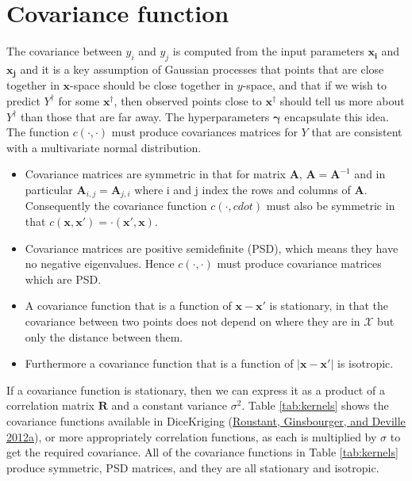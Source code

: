 \documentclass[
  12pt,
  a4paper,
  twoside]{book}
\providecommand{\tightlist}{%
  \setlength{\itemsep}{0pt}\setlength{\parskip}{0pt}}
\begin{document}
\hypertarget{covariance}{%
\section{Covariance function}\label{covariance}}

The covariance between \(y_i\) and \(y_j\) is computed from the input parameters \(\mathbf{x_i}\) and \(\mathbf{x_j}\) and it is a key assumption of Gaussian processes that points that are close together in \(\mathbf{x}\)-space should be close together in \(y\)-space, and that if we wish to predict \(Y^\dagger\) for some \(\mathbf{x^\dagger}\), then observed points close to \(\mathbf{x^\dagger}\) should tell us more about \(Y^\dagger\) than those that are far away. The hyperparameters \(\mathbf{\gamma}\) encapsulate this idea. The function \(c(\cdot, \cdot)\) must
produce covariances matrices for \(Y\) that are consistent with a multivariate normal distribution.

\begin{itemize}
\tightlist
\item
  Covariance matrices are symmetric in that for matrix \(\mathbf{A}\), \(\mathbf{A}=\mathbf{A}^{-1}\) and in particular \(\mathbf{A}_{i,j} = \mathbf{A}_{j,i}\) where i and j index the rows and columns of \(\mathbf{A}\). Consequently the covariance function \(c(\cdot, cdot)\) must also be symmetric in that \(c(\mathbf{x}, \mathbf{x'}) = \cdot(\mathbf{x'}, \mathbf{x})\).
\item
  Covariance matrices are positive semidefinite (PSD), which means they have no negative eigenvalues. Hence \(c(\cdot,\cdot)\) must produce covariance matrices which are PSD.
\item
  A covariance function that is a function of \(\mathbf{x} - \mathbf{x'}\) is stationary, in that the covariance between two points does not depend on where they are in \(\mathcal{X}\) but only the distance between them.
\item
  Furthermore a covariance function that is a function of \(|\mathbf{x} - \mathbf{x'}|\) is isotropic.
\end{itemize}

If a covariance function is stationary, then we can express it as a product of a correlation matrix \(\mathbf{R}\) and a constant variance \(\sigma^2\). Table \ref{tab:kernels} shows the covariance functions available in DiceKriging (\protect\hyperlink{ref-dicekriging}{Roustant, Ginsbourger, and Deville 2012a}), or more appropriately correlation functions, as each is multiplied by \(\sigma\) to get the required covariance. All of the covariance functions in Table \ref{tab:kernels} produce symmetric, PSD matrices, and they are all stationary and isotropic.
\end{document}
